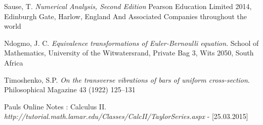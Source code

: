 \begin{thebibliography}{9}
  Sause, T. 
  \emph{Numerical Analysis, Second Edition}
  Pearson Education Limited 2014, Edinburgh Gate, Harlow, England And Associated Companies throughout the world
  
  Ndogmo, J. C. 
  \emph{Equivalence transformations of Euler-Bernoulli equation}.
  School of Mathematics, University of the Witwatersrand, Private Bag 3, Wits 2050, South
Africa

  Timoshenko, S.P. 
  \emph{On the transverse vibrations of bars of uniform cross-section}.
  Philosophical Magazine 43 (1922) 125–131
  
   Pauls Online Notes : Calculus II. 
    \emph{http://tutorial.math.lamar.edu/Classes/CalcII/TaylorSeries.aspx} - [25.03.2015]

\end{thebibliography}